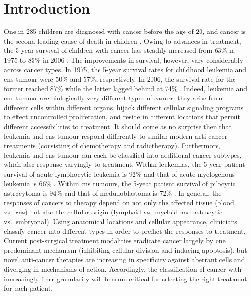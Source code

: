 \chapter{Introduction}
\label{ch:intro}

One in 285 children are diagnosed with cancer before the age of 20, and cancer is the second leading cause of death in children . Owing to advances in treatment, the 5-year survival of children with cancer has steadily increased from 63\% in 1975 to 85\% in 2006 . The improvements in survival, however, vary considerably across cancer types. In 1975, the 5-year survival rates for childhood leukemia and \gls{cns} tumour were 50\% and 57\%, respectively. In 2006, the survival rate for the former reached 87\% while the latter lagged behind at 74\% . Indeed, leukemia and \gls{cns} tumour are biologically very different types of cancer: they arise from different cells within different organs, hijack different cellular signaling programs to effect uncontrolled proliferation, and reside in different locations that permit different accessibilities to treatment. It should come as no surprise then that leukemia and \gls{cns} tumour respond differently to similar modern anti-cancer treatments (consisting of chemotherapy and radiotherapy). Furthermore, leukemia and \gls{cns} tumour can each be classified into additional cancer subtypes, which also response varyingly to treatment. Within leukemias, the 5-year patient survival of acute lymphocytic leukemia is 92\% and that of acute myelogenous leukemia is 66\% . Within \gls{cns} tumours, the 5-year patient survival of pilocytic astrocytoma is 94\% and that of medulloblastoma is 72\% . In general, the responses of cancers to therapy depend on not only the affected tissue (blood vs.\ \gls{cns}) but also the cellular origin (lymphoid vs.\ myeloid and astrocytic vs.\ embryonal). Using anatomical locations and cellular appearance, clinicians classify cancer into different types in order to predict the responses to treatment. Current post-surgical treatment modalities eradicate cancer largely by one predominant mechanism (inhibiting cellular division and inducing apoptosis), but novel anti-cancer therapies are increasing in specificity against aberrant cells and diverging in mechanisms of action. Accordingly, the classification of cancer with increasingly finer granularity will become critical for selecting the right treatment for each patient.


